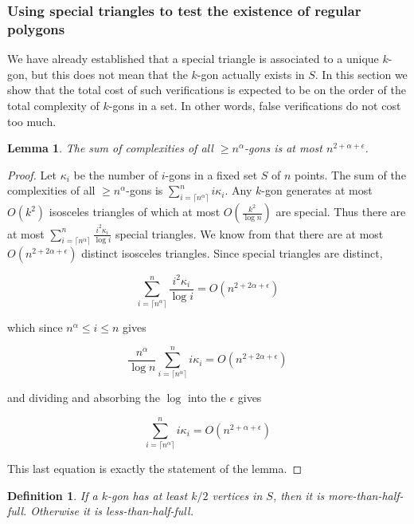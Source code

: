 \documentclass{article}
\newtheorem{lemma}{Lemma}
\newtheorem{defini}{Definition}
\begin{document}
\subsubsection{Using special triangles to test the existence of regular polygons}
\label{testing}
We have already established that a special triangle is associated to a unique $k$-gon, but 
this does not mean that the  $k$-gon actually exists in $S$.   In this section we show that the total cost
of such verifications is expected to be on the order of the total complexity of $k$-gons in a set.
In other words, false  verifications do not cost too much.

\begin{lemma}
\label{l2}
The sum of complexities of all ${\geq} n^{\alpha}$-gons is at most
$n^{2{+}\alpha+\epsilon}$.
\end{lemma}

\begin{proof}
Let $\kappa_i$ be the number of $i$-gons in a fixed set $S$ of $n$ points.
The sum of the complexities of all ${\geq} n^{\alpha}$-gons is
$\sum_{i=\lceil n^{\alpha}\rceil}^n i \kappa_i$. Any $k$-gon generates at most $O(k^2)$
isosceles triangles of which at most  $O(\frac{k^2}{\log n})$ are special.
Thus there are at most  $\sum_{i=\lceil n^{\alpha}\rceil}^n \frac{i^2 \kappa_i}{\log i}$
special triangles. We know from 
\cite{pach} that there are at most $O(n^{2{+}2\alpha{+}\epsilon})$ distinct isosceles triangles.
Since special triangles are distinct, 

\[ \sum_{i=\lceil n^{\alpha}\rceil}^n \frac{i^2 \kappa_i}{\log i} = O(n^{2{+}2\alpha{+}\epsilon}) \]

\noindent
which since $n^{\alpha} {\leq} i {\leq} n$ gives

\[ \frac{n^{\alpha}}{\log n}\sum_{i=\lceil n^{\alpha}\rceil}^n i  \kappa_i = O(n^{2{+}2\alpha{+}\epsilon}) \]

\noindent and dividing and absorbing the $\log$ into the $\epsilon$ gives

\[ \sum_{i=\lceil n^{\alpha}\rceil}^n {i \kappa_i} = O(n^{2{+}\alpha + \epsilon}) \]

\noindent This last equation is exactly the statement of the lemma.
\end{proof}

\begin{defini}
If a $k$-gon has at least $k/2$ vertices in $S$, then it is \emph{more-than-half-full}.
Otherwise it is \emph{less-than-half-full}.
\end{defini}
\end{document}
